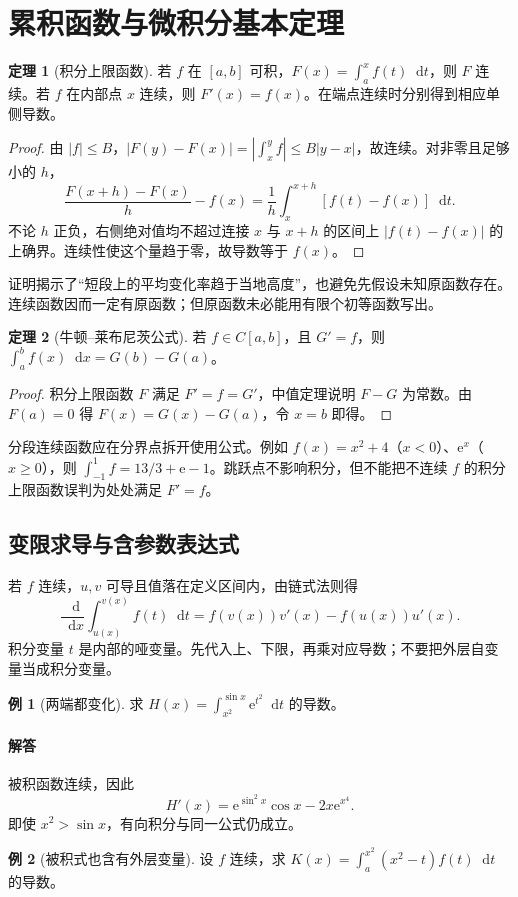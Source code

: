 \documentclass[UTF8,fontset=fandol,12pt,oneside,openany]{ctexrep}
\newcommand{\dd}{\mathop{}\!\mathrm d}
\newcommand{\ee}{\mathrm e}
\theoremstyle{definition}
\newtheorem{theorem}{定理}[chapter]
\newtheorem{example}{例}[chapter]
\begin{document}
\section{累积函数与微积分基本定理}
\label{lec:11:ftc}
\begin{theorem}[积分上限函数]
若 $f$ 在 $[a,b]$ 可积，$F(x)=\int_a^x f(t)\dd t$，则 $F$ 连续。若 $f$ 在内部点 $x$ 连续，则 $F'(x)=f(x)$。在端点连续时分别得到相应单侧导数。
\end{theorem}
\begin{proof}
由 $|f|\le B$，$|F(y)-F(x)|=|\int_x^y f|\le B|y-x|$，故连续。对非零且足够小的 $h$，
\[\frac{F(x+h)-F(x)}h-f(x)=\frac1h\int_x^{x+h}[f(t)-f(x)]\dd t.\]
不论 $h$ 正负，右侧绝对值均不超过连接 $x$ 与 $x+h$ 的区间上 $|f(t)-f(x)|$ 的上确界。连续性使这个量趋于零，故导数等于 $f(x)$。
\end{proof}
证明揭示了“短段上的平均变化率趋于当地高度”，也避免先假设未知原函数存在。连续函数因而一定有原函数；但原函数未必能用有限个初等函数写出。
\begin{theorem}[牛顿--莱布尼茨公式]
若 $f\in C[a,b]$，且 $G'=f$，则 $\int_a^b f(x)\dd x=G(b)-G(a)$。
\end{theorem}
\begin{proof}
积分上限函数 $F$ 满足 $F'=f=G'$，中值定理说明 $F-G$ 为常数。由 $F(a)=0$ 得 $F(x)=G(x)-G(a)$，令 $x=b$ 即得。
\end{proof}
分段连续函数应在分界点拆开使用公式。例如 $f(x)=x^2+4$（$x<0$）、$\ee^x$（$x\ge0$），则 $\int_{-1}^1f=13/3+\ee-1$。跳跃点不影响积分，但不能把不连续 $f$ 的积分上限函数误判为处处满足 $F'=f$。

\subsection{变限求导与含参数表达式}
若 $f$ 连续，$u,v$ 可导且值落在定义区间内，由链式法则得
\[\frac{\dd}{\dd x}\int_{u(x)}^{v(x)}f(t)\dd t=f(v(x))v'(x)-f(u(x))u'(x).\]
积分变量 $t$ 是内部的哑变量。先代入上、下限，再乘对应导数；不要把外层自变量当成积分变量。
\begin{example}[两端都变化]
求 $H(x)=\int_{x^2}^{\sin x}\ee^{t^2}\dd t$ 的导数。
\end{example}
\paragraph{解答} 被积函数连续，因此
\[H'(x)=\ee^{\sin^2x}\cos x-2x\ee^{x^4}.\]
即使 $x^2>\sin x$，有向积分与同一公式仍成立。
\begin{example}[被积式也含有外层变量]
设 $f$ 连续，求 $K(x)=\int_a^{x^2}(x^2-t)f(t)\dd t$ 的导数。
\end{example}
\end{document}

